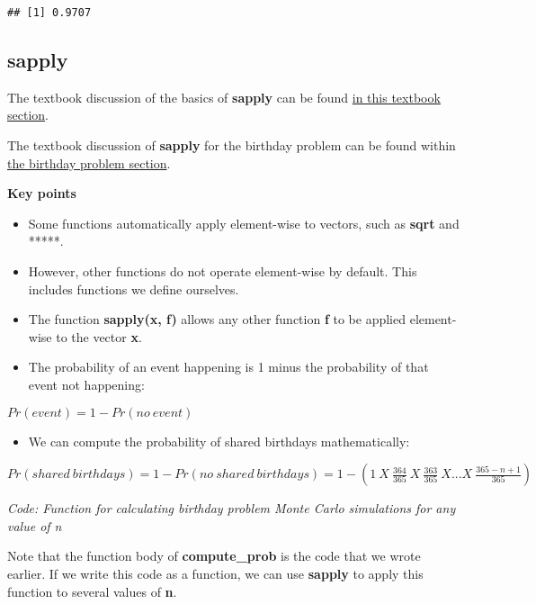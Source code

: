 \documentclass[
]{article}
\providecommand{\tightlist}{%
  \setlength{\itemsep}{0pt}\setlength{\parskip}{0pt}}
\begin{document}
\begin{verbatim}
## [1] 0.9707
\end{verbatim}

\hypertarget{sapply}{%
\subsection{sapply}\label{sapply}}

The textbook discussion of the basics of \textbf{sapply} can be found
\href{https://rafalab.github.io/dsbook/programming-basics.html\#vectorization}{in
this textbook section}.

The textbook discussion of \textbf{sapply} for the birthday problem can
be found within
\href{https://rafalab.github.io/dsbook/probability.html\#birthday-problem}{the
birthday problem section}.

\textbf{Key points}

\begin{itemize}
\tightlist
\item
  Some functions automatically apply element-wise to vectors, such as
  \textbf{sqrt} and *****.
\item
  However, other functions do not operate element-wise by default. This
  includes functions we define ourselves.
\item
  The function \textbf{sapply(x, f)} allows any other function
  \textbf{f} to be applied element-wise to the vector \textbf{x}.
\item
  The probability of an event happening is 1 minus the probability of
  that event not happening:
\end{itemize}

\(Pr(event) = 1 - Pr(no\:event)\)

\begin{itemize}
\tightlist
\item
  We can compute the probability of shared birthdays mathematically:
\end{itemize}

\(Pr(shared\:birthdays) = 1 − Pr(no\:shared\:birthdays) = 1 − (1\:X\: \frac{364}{365}\:X \:\frac{363}{365}\:X...X\: \frac{365−n+1}{365})\)

\emph{Code: Function for calculating birthday problem Monte Carlo
simulations for any value of n}

Note that the function body of \textbf{compute\_prob} is the code that
we wrote earlier. If we write this code as a function, we can use
\textbf{sapply} to apply this function to several values of \textbf{n}.
\end{document}
